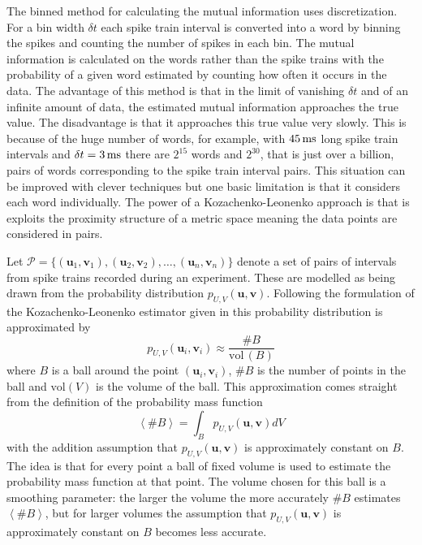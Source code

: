 \documentclass[12pt]{article}
\newcommand{\ms}{\mbox{\,ms}}
\renewcommand{\u}{\mathbf{u}}
\renewcommand{\v}{\mathbf{v}}
\begin{document}
The binned method for calculating the mutual information uses
discretization. For a bin width $\delta t$ each spike train interval
is converted into a word by binning the spikes and counting the number
of spikes in each bin. The mutual information is calculated on the
words rather than the spike trains with the probability of a given
word estimated by counting how often it occurs in the data. The
advantage of this method is that in the limit of vanishing $\delta t$
and of an infinite amount of data, the estimated mutual information
approaches the true value. The disadvantage is that it approaches this
true value very slowly. This is because of the huge number of words,
for example, with $45\ms$ long spike train intervals and $\delta
t=3\ms$ there are $2^{15}$ words and $2^{30}$, that is just over a
billion, pairs of words corresponding to the spike train interval
pairs. This situation can be improved with clever techniques
\citep{TrevesPanzeri1995,NemenmanEtAl2004,MagriEtAl2009} but one basic
limitation is that it considers each word individually. The power of a
Kozachenko-Leonenko approach is that is exploits the proximity
structure of a metric space meaning the data points are considered in
pairs.

Let $ \mathcal{P}=\{(\u_1,\v_1),(\u_2,\v_2),\ldots,(\u_n,\v_n)\} $
denote a set of pairs of intervals from spike trains recorded during an
experiment. These are modelled as being drawn from the probability
distribution $p_{U,V}(\u,\v)$. Following the formulation of the
Kozachenko-Leonenko estimator given in \citet{Houghton2015} this
probability distribution is approximated by
\begin{equation}
 p_{U,V}(\u_i,\v_i)\approx\frac{\#B}{\mbox{vol}\,(B)}
\end{equation}
where $B$ is a ball around the point $(\u_i,\v_i)$, $\#B$ is the number of
points in the ball and $\mbox{vol}(V)$ is the volume of the ball. This
approximation comes straight from the definition of the probability mass function
\begin{equation}
\left\langle \#B\right\rangle = \int_B p_{U,V}(\u,\v)dV
\end{equation}
with the addition assumption that $p_{U,V}(\u,\v)$ is approximately
constant on $B$. The idea is that for every point a ball of fixed
volume is used to estimate the probability mass function at that
point. The volume chosen for this ball is a smoothing parameter: the
larger the volume the more accurately $\#B$ estimates $\left\langle
\#B\right\rangle$, but for larger volumes the assumption that
$p_{U,V}(\u,\v)$ is approximately constant on $B$ becomes less
accurate.
\end{document}
